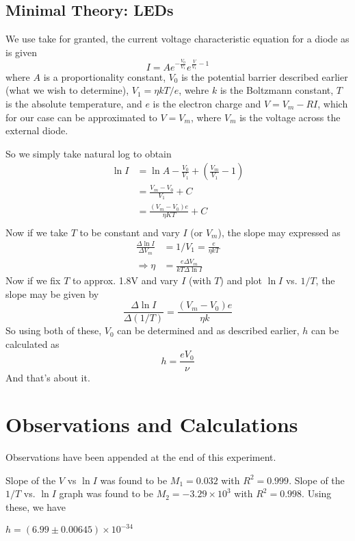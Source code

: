 	\subsection{Minimal Theory: LEDs}
		We use take for granted, the current voltage characteristic equation for a diode as is given
		\begin{equation}
			I=Ae^{ - \frac {V_0}{V_1}}e^{\frac V {V_1} -1}
		\end{equation}
		where $A$ is a proportionality constant, $V_0$ is the potential barrier described earlier (what we wish to determine), $V_1=\eta k T /e$, wehre $k$ is the Boltzmann constant, $T$ is the absolute temperature, and $e$ is the electron charge and $V=V_m-RI$, which for our case can be approximated to $V=V_m$, where $V_m$ is the voltage across the external diode.
		\par
		So we simply take natural log to obtain
		\begin{align}
			\ln I 	&= \ln A - \frac{V_0}{V_1} + (\frac{V_m}{V_1} - 1)\\
					&=\frac{V_m-V_0}{V_1} + C\\
					&=\frac{(V_m-V_0)e}{\eta K T} + C\\
		\end{align}
		Now if we take $T$ to be constant and vary $I$ (or $V_m$), the slope may expressed as
		\begin{align}
			\frac {\Delta \ln I} {\Delta V_m} &= 1/V_1 = \frac e {\eta kT}\\
			\Rightarrow \eta &= \frac{e \Delta V_m}{kT \Delta \ln I}
		\end{align}
		Now if we fix $T$ to approx. 1.8V and vary $I$ (with $T$) and plot $\ln I$ vs. $1/T$, the slope may be given by
		\begin{equation}
			\frac{\Delta \ln I}{\Delta(1/T)}=\frac{(V_m-V_0)e}{\eta k}
		\end{equation}
		So using both of these, $V_0$ can be determined and as described earlier, $h$ can be calculated as
		\begin{equation}
			h=\frac {eV_0}{\nu}
		\end{equation}
		And that's about it.
\section{Observations and Calculations}	
	Observations have been appended at the end of this experiment.
	\par
	Slope of the $V$ vs $\ln I$ was found to be $M_1=0.032$ with $R^2=0.999$. Slope of the $1/T$ vs. $\ln I$ graph was found to be $M_2=-3.29\times 10^3$ with $R^2=0.998$. Using these, we have \par
	$h=(6.99 \pm 0.00645)\times 10^{-34} $

